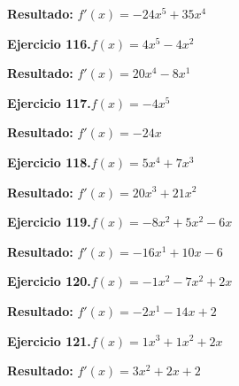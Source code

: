 \documentclass[10pt,a4paper]{article}
\begin{document}
\begin{solbox}
\textbf{Resultado:} \(\displaystyle f'(x) = -24x^{5} + 35x^{4}\)
\end{solbox}

\begin{ejbox}
\textbf{Ejercicio 116.}\quad $f(x) = 4x^{5} -4x^{2}$
\end{ejbox}

\begin{solbox}
\textbf{Resultado:} \(\displaystyle f'(x) = 20x^{4} -8x^{1}\)
\end{solbox}

\begin{ejbox}
\textbf{Ejercicio 117.}\quad $f(x) = -4x^{5}$
\end{ejbox}

\begin{solbox}
\textbf{Resultado:} \(\displaystyle f'(x) = -24x\)
\end{solbox}

\newpage
\begin{ejbox}
\textbf{Ejercicio 118.}\quad $f(x) = 5x^{4} + 7x^{3}$
\end{ejbox}

\begin{solbox}
\textbf{Resultado:} \(\displaystyle f'(x) = 20x^{3} + 21x^{2}\)
\end{solbox}

\begin{ejbox}
\textbf{Ejercicio 119.}\quad $f(x) = -8x^{2} +5x^2 -6x$
\end{ejbox}

\begin{solbox}
\textbf{Resultado:} \(\displaystyle f'(x) = -16x^{1} +10x -6\)
\end{solbox}

\begin{ejbox}
\textbf{Ejercicio 120.}\quad $f(x) = -1x^{2} -7x^2 +2x$
\end{ejbox}

\begin{solbox}
\textbf{Resultado:} \(\displaystyle f'(x) = -2x^{1} -14x +2\)
\end{solbox}

\newpage
\begin{ejbox}
\textbf{Ejercicio 121.}\quad $f(x) = 1x^3 +1x^2 +2x$
\end{ejbox}

\begin{solbox}
\textbf{Resultado:} \(\displaystyle f'(x) = 3x^2 +2x +2\)
\end{solbox}
\end{document}
